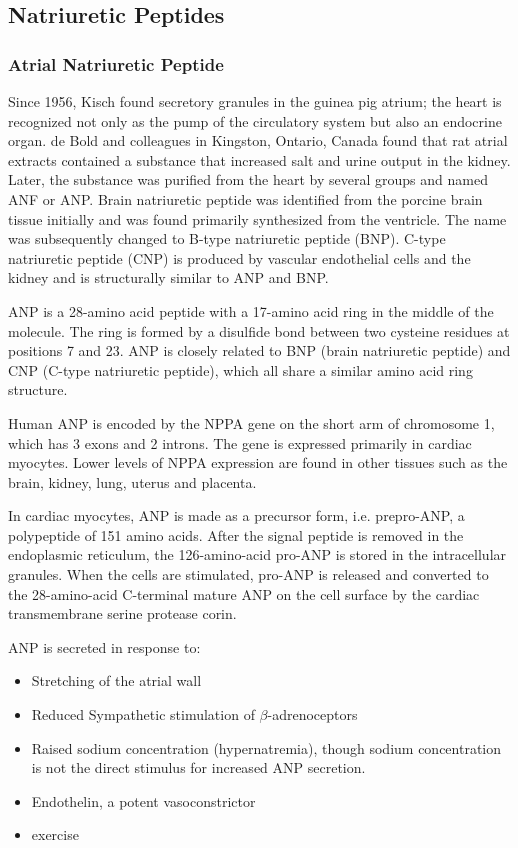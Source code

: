 \documentclass[14pt,a4paper,onecolumn]{article}
\begin{document}
\subsection{Natriuretic Peptides}


\subsubsection{Atrial Natriuretic Peptide}
Since 1956, Kisch found secretory granules in the guinea pig atrium; the heart is recognized not only as the pump of the circulatory system but also an endocrine organ.\citep{Kisch1956} \citep{deBold1979} de Bold and colleagues in Kingston, Ontario, Canada found that rat atrial extracts contained a substance that increased salt and urine output in the kidney.\citep{deBoldetal1981} Later, the substance was purified from the heart by several groups and named ANF or ANP.\citep{deBold1985}  Brain natriuretic peptide was identified from the porcine brain tissue initially and was found primarily synthesized from the ventricle. The name was subsequently changed to B-type natriuretic peptide (BNP). C-type natriuretic peptide (CNP) is produced by vascular endothelial cells and the kidney and is structurally similar to ANP and BNP.

ANP is a 28-amino acid peptide with a 17-amino acid ring in the middle of the molecule. The ring is formed by a disulfide bond between two cysteine residues at positions 7 and 23. ANP is closely related to BNP (brain natriuretic peptide) and CNP (C-type natriuretic peptide), which all share a similar amino acid ring structure.

Human ANP is encoded by the NPPA gene on the short arm of chromosome 1, which has 3 exons and 2 introns. The gene is expressed primarily in cardiac myocytes. Lower levels of NPPA expression are found in other tissues such as the brain, kidney, lung, uterus and placenta.

In cardiac myocytes, ANP is made as a precursor form, i.e. prepro-ANP, a polypeptide of 151 amino acids. After the signal peptide is removed in the endoplasmic reticulum, the 126-amino-acid pro-ANP is stored in the intracellular granules. When the cells are stimulated, pro-ANP is released and converted to the 28-amino-acid C-terminal mature ANP on the cell surface by the cardiac transmembrane serine protease corin.\citep{Yanetal1999}\citep{Yanetal2000}

    ANP is secreted in response to:
    \begin{itemize}
        \item Stretching of the atrial wall \citep{Widmaieretal2008}
        \item Reduced Sympathetic stimulation of $\beta$-adrenoceptors
        \item Raised sodium concentration (hypernatremia), though sodium concentration is not the direct stimulus for increased ANP secretion. \citep{Widmaieretal2008}
        \item Endothelin, a potent vasoconstrictor
        \item exercise \citep{Kokkonenetal2002}
    \end{itemize}
\end{document}
